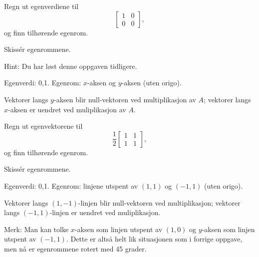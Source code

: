 \begin{oppgave}

\begin{punkt}
Regn ut egenverdiene til $$\begin{bmatrix}
1 & 0\\
0 & 0
\end{bmatrix},
$$ og finn tilhørende egenrom. 
\end{punkt}

\begin{punkt}
Skissér egenrommene.

\noindent 

Hint: Du har løst denne oppgaven tidligere.
\end{punkt}

\end{oppgave}

\begin{losning}

\begin{punkt}
Egenverdi: 0,1. Egenrom: $x$-aksen og $y$-aksen (uten origo).
\end{punkt}

\begin{punkt}
Vektorer langs $y$-aksen blir null-vektoren ved multiplikasjon av $A$; vektorer langs $x$-aksen er uendret ved muliplikasjon av $A$.
\end{punkt}

\end{losning}


\begin{oppgave}
\begin{punkt}
Regn ut egenvektorene til $$\frac{1}{2}\begin{bmatrix}
1 & 1\\
1 & 1
\end{bmatrix},
$$ og finn tilhørende egenrom.

\end{punkt}

\begin{punkt}
Skissér egenrommene.
\end{punkt}

\end{oppgave}


\begin{losning}

\begin{punkt}
Egenverdi: 0,1. Egenrom: linjene utspent av $(1,1)$ og $(-1,1)$ (uten origo).
\end{punkt}

\begin{punkt}
Vektorer langs $(1,-1)$-linjen blir null-vektoren ved multiplikasjon; vektorer langs $(-1,1)$-linjen er uendret ved muliplikasjon.

\noindent
Merk: Man kan tolke $x$-aksen som linjen utspent av $(1,0)$ og $y$-aksen som linjen utspent av $(-1,1)$. Dette er altså helt lik situasjonen som i forrige oppgave, men nå er egenrommene rotert med 45 grader.
\end{punkt}

\end{losning}



